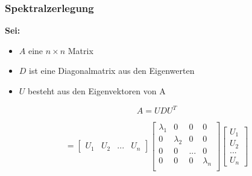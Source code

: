 \begin{frame}
    \frametitle{Spektralzerlegung}
    \textbf{Sei: }
    \begin{itemize}
        \item   $A$ eine $n \times n$ Matrix
        \item   $D$ ist eine Diagonalmatrix aus den Eigenwerten
        \item   $U$ besteht aus den Eigenvektoren von A
   \end{itemize}

    \hfil

    $$A =  U D U^T$$

    $$= \begin{bmatrix} U_1&U_2&...&U_n \end{bmatrix}
    \begin{bmatrix} \lambda_1 & 0 & 0 & 0\\ 0 & \lambda_2 &0 & 0\\ 0 & 0 & ... & 0\\ 0 & 0 & 0& \lambda_n \\ \end{bmatrix}
    \begin{bmatrix} U_1\\ U_2\\ ...\\ U_n\end{bmatrix}$$


\end{frame}

